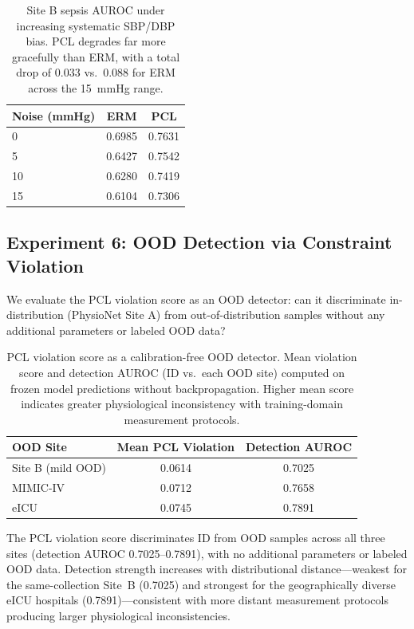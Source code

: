 \documentclass{article}
\begin{document}
\begin{table}[htbp]
\caption{Site B sepsis AUROC under increasing systematic SBP/DBP bias. PCL degrades far more gracefully than ERM, with a total drop of $0.033$ vs.\ $0.088$ for ERM across the 15~mmHg range.}
\label{tab:noise}
\centering
\small
\begin{tabular}{@{}lcc@{}}
\toprule
Noise (mmHg) & ERM & PCL \\
\midrule
0 & 0.6985 & 0.7631 \\
5 & 0.6427 & 0.7542 \\
10 & 0.6280 & 0.7419 \\
15 & 0.6104 & 0.7306 \\
\bottomrule
\end{tabular}
\end{table}

\subsection{Experiment 6: OOD Detection via Constraint Violation}
\label{sec:exp6}

We evaluate the PCL violation score as an OOD detector: can it discriminate in-distribution (PhysioNet Site A) from out-of-distribution samples without any additional parameters or labeled OOD data?

\begin{table}[htbp]
\caption{PCL violation score as a calibration-free OOD detector. Mean violation score and detection AUROC (ID vs.\ each OOD site) computed on frozen model predictions without backpropagation. Higher mean score indicates greater physiological inconsistency with training-domain measurement protocols.}
\label{tab:ood_detection}
\centering
\small
\begin{tabular}{@{}lcc@{}}
\toprule
OOD Site & Mean PCL Violation & Detection AUROC \\
\midrule
Site B (mild OOD) & 0.0614 & 0.7025 \\
MIMIC-IV & 0.0712 & 0.7658 \\
eICU & 0.0745 & 0.7891 \\
\bottomrule
\end{tabular}
\end{table}

The PCL violation score discriminates ID from OOD samples across all three sites (detection AUROC 0.7025--0.7891), with no additional parameters or labeled OOD data.
Detection strength increases with distributional distance---weakest for the same-collection Site~B (0.7025) and strongest for the geographically diverse eICU hospitals (0.7891)---consistent with more distant measurement protocols producing larger physiological inconsistencies.
\end{document}
